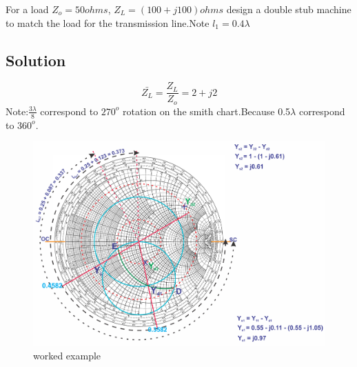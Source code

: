 \begin{exmp}
For a load $Z_{o} = 50ohms$, $Z_{L} = (100 + j100)ohms$ design a double stub machine to match the load for the transmission line.Note $l_{1} = 0.4\lambda$
\subsection{Solution}
$$\bar{Z_{L}} = \frac{Z_{L}}{Z_{o}} = 2 + j2$$
Note:$\frac{3\lambda}{8}$ correspond to $270^{o} $ rotation on the smith chart.Because 0.5$\lambda$ correspond to $ 360^{o}$. 
\begin{figure}[h]
\centering
\includegraphics[width=1\linewidth]{./graphics/question1}
\caption{worked example}
\end{figure}
				

\end{exmp}
